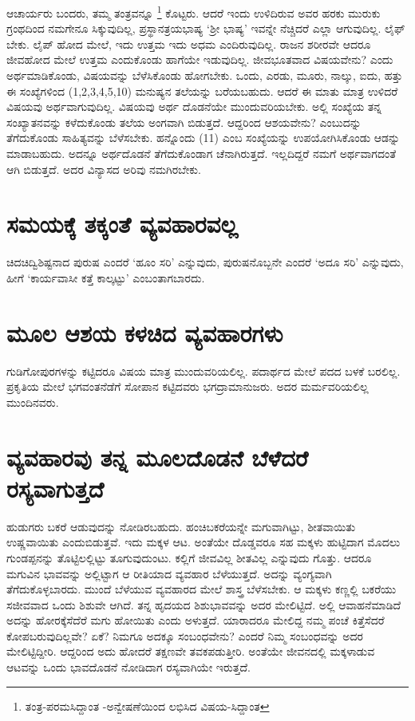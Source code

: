 ಆಚಾರ್ಯರು ಬಂದರು, ತಮ್ಮ ತಂತ್ರವನ್ನೂ \footnote{ತಂತ್ರ-ಪರಮಸಿದ್ದಾಂತ -ಅನ್ವೇಷಣೆಯಿಂದ ಲಭಿಸಿದ ವಿಷಯ-ಸಿದ್ದಾಂತ} ಕೊಟ್ಟರು. ಆದರೆ ಇಂದು ಉಳಿದಿರುವ ಅವರ ಹರಕು ಮುರುಕು ಗ್ರಂಥದಿಂದ ನಮಗೇನೂ ಸಿಕ್ಕುವುದಿಲ್ಲ, ಪ್ರಸ್ಥಾನತ್ರಯಭಾಷ್ಯ `ಶ್ರೀ ಭಾಷ್ಯ' ಇವನ್ನೇ ನೆಚ್ಚಿದರೆ ಎಲ್ಲಾ ಆಗುವುದಿಲ್ಲ. ಲೈಫ್ ಬೇಕು. ಲೈಪ್ ಹೋದ ಮೇಲೆ, ಇದು ಉತ್ತಮ ಇದು ಅಧಮ ಎಂದಿರುವುದಿಲ್ಲ. ರಾಜನ ಶರೀರವೇ ಆದರೂ ಜೀವಹೋದ ಮೇಲೆ ಉತ್ತಮ ಎಂದುಕೊಂಡು ಹಾಗೆಯೇ ಇಡುವುದಿಲ್ಲ. ಜೀವಭೂತವಾದ ವಿಷಯವೇನು? ಎಂದು ಅರ್ಥಮಾಡಿಕೊಂಡು, ವಿಷಯವನ್ನು ಬೆಳೆಸಿಕೊಂಡು ಹೋಗಬೇಕು. ಒಂದು, ಎರಡು, ಮೂರು, ನಾಲ್ಕು, ಐದು, ಹತ್ತು ಈ ಸಂಖ್ಯೆಗಳಿಂದ (1,2,3,4,5,10) ಮನುಷ್ಯನ ತಲೆಯನ್ನು ಬರೆಯಬಹುದು. ಆದರೆ ಈ ಮಾತು ಮಾತ್ರ ಉಳಿದರೆ ವಿಷಯವು ಅರ್ಥವಾಗುವುದಿಲ್ಲ. ವಿಷಯವು ಅರ್ಥ ದೊಡನೆಯೇ ಮುಂದುವರಿಯಬೇಕು. ಅಲ್ಲಿ ಸಂಖ್ಯೆಯ ತನ್ನ ಸಂಖ್ಯಾತನವನ್ನು ಕಳೆದುಕೊಂಡು ತಲೆಯ ಅಂಗವಾಗಿ ಬಿಡುತ್ತದೆ. ಆದ್ದರಿಂದ ಆಶಯವೇನು? ಎಂಬುದನ್ನು ತೆಗೆದುಕೊಂಡು ಸಾಹಿತ್ಯವನ್ನು ಬೆಳೆಸಬೇಕು. ಹನ್ನೊಂದು (11) ಎಂಬ ಸಂಖ್ಯೆಯನ್ನು ಉಪಯೋಗಿಸಿಕೊಂಡು ಆಡನ್ನು ಮಾಡಾಬಹುದು. ಅದನ್ನೂ ಅರ್ಥದೊಡನೆ ತೆಗೆದುಕೊಂಡಾಗ ಚೆನಾಗಿರುತ್ತದೆ. ಇಲ್ಲದಿದ್ದರೆ ನಮಗೆ ಅರ್ಥವಾಗದಂತೆ ಆಗಿ ಬಿಡುತ್ತದೆ. ಅದರ ವಿನ್ಯಾಸದ ಅರಿವು ನಮಗಿರಬೇಕು.

\section*{ಸಮಯಕ್ಕೆ  ತಕ್ಕಂತೆ ವ್ಯವಹಾರವಲ್ಲ}

ಚಿದಚಿದ್ವಿಶಿಷ್ಟನಾದ ಪುರುಷ ಎಂದರೆ `ಹೂಂ ಸರಿ' ಎನ್ನುವುದು, ಪುರುಷನೊಬ್ಬನೇ ಎಂದರೆ `ಅದೂ ಸರಿ' ಎನ್ನುವುದು, ಹೀಗೆ `ಕಾರ್ಯವಾಸೀ ಕತ್ತೆ ಕಾಲ್ಕಟ್ಟು' ಎಂಬಂತಾಗಬಾರದು.

\section*{ಮೂಲ ಆಶಯ ಕಳಚಿದ ವ್ಯವಹಾರಗಳು}

ಗುಡಿಗೋಪುರಗಳನ್ನು ಕಟ್ಟಿದರೂ ವಿಷಯ ಮಾತ್ರ ಮುಂದುವರಿಯಲಿಲ್ಲ. ಪದಾರ್ಥದ ಮೇಲೆ ಪದದ ಬಳಕೆ ಬರಲಿಲ್ಲ. ಪ್ರಕೃತಿಯ ಮೇಲೆ ಭಗವಂತನೆಡೆಗೆ ಸೋಪಾನ ಕಟ್ಟಿದವರು ಭಗದ್ರಾಮಾನುಜರು. ಅದರ ಮರ್ಮವರಿಯಲಿಲ್ಲ ಮುಂದಿನವರು.

\section*{ವ್ಯವಹಾರವು ತನ್ನ ಮೂಲದೊಡನೆ ಬೆಳೆದರೆ ರಸ್ಯವಾಗುತ್ತದೆ}

ಹುಡುಗರು ಬಕರೆ ಆಡುವುದನ್ನು ನೋಡಿರಬಹುದು. ಹಂಚಿಬಕರೆಯನ್ನೇ ಮಗುವಾಗಿಟ್ಟು, ಶೀತವಾಯಿತು ಉಷ್ಣವಾಯಿತು ಎಂದುಬಿಡುತ್ತವೆ. ಇದು ಮಕ್ಕಳ ಆಟ. ಅಂತೆಯೇ ದೊಡ್ಡವರೂ ಸಹ ಮಕ್ಕಳು ಹುಟ್ಟಿದಾಗ ಮೊದಲು ಗುಂಡಪ್ಪನನ್ನು ತೊಟ್ಟಿಲಲ್ಲಿಟ್ಟು ತೂಗುವುದುಂಟು. ಕಲ್ಲಿಗೆ ಜೀವವಿಲ್ಲ ಶೀತವಿಲ್ಲ ಎನ್ನುವುದು ಗೊತ್ತು. ಆದರೂ ಮಗುವಿನ ಭಾವವನ್ನು ಅಲ್ಲಿಟ್ಟಾಗ ಆ ರೀತಿಯಾದ ವ್ಯವಹಾರ ಬೆಳೆಯುತ್ತದೆ. ಅದನ್ನು ವ್ಯಂಗ್ಯವಾಗಿ ತೆಗೆದುಕೊಳ್ಳಬಾರದು. ಮುಂದೆ ಬೆಳೆಯುವ ವ್ಯವಹಾರದ ಮೇಲೆ ಶಾಸ್ತ್ರ ಬೆಳೆಸಬೇಕು. ಆ ಮಕ್ಕಳು ಕಣ್ಣಲ್ಲಿ ಬಕರೆಯು ಸಜೀವವಾದ ಒಂದು ಶಿಶುವೇ ಆಗಿದೆ. ತನ್ನ ಹೃದಯದ ಶಿಶುಭಾವವನ್ನು ಅದರ ಮೇಲಿಟ್ಟಿದೆ. ಅಲ್ಲಿ ಆವಾಹನೆಮಾಡಿದೆ ಅದನ್ನು ಹೋರಕ್ಕೆಸೆದೆರೆ ಮಗು ಹೋಯಿತು ಎಂದು ಅಳುತ್ತದೆ. ಯಾರಾದರೂ ಮೇಲಿದ್ದ ನಮ್ಮ ಪಂಚೆ ಕಿತ್ತೆಸೆದರೆ ಕೋಪಬರುವುದಿಲ್ಲವೇ? ಏಕೆ? ನಿಮಗೂ ಅದಕ್ಕೂ ಸಂಬಂಧವೇನು? ಎಂದರೆ ನಿಮ್ಮ ಸಂಬಂಧವನ್ನು ಅದರ ಮೇಲಿಟ್ಟಿದ್ದೀರಿ. ಆದ್ದರಿಂದ ಅದು ಹೋದರೆ ತಕ್ಷಣವೇ ತವಕಪಡುತ್ತೀರಿ. ಅಂತೆಯೇ ಜೀವನದಲ್ಲಿ ಮಕ್ಕಳಾಡುವ ಆಟವನ್ನು ಒಂದು ಭಾವದೊಡನೆ ನೋಡಿದಾಗ ರಸ್ಯವಾಗಿಯೇ ಇರುತ್ತದೆ.

